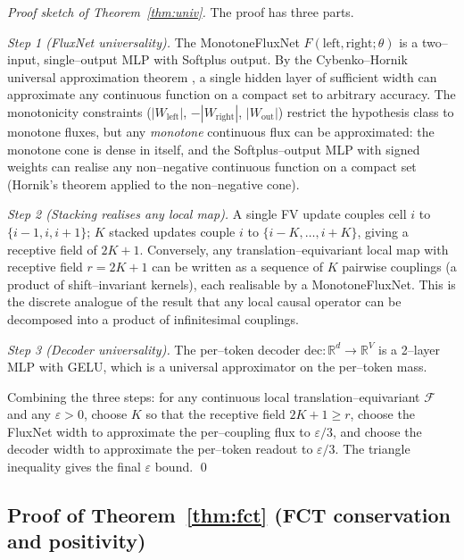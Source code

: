 \documentclass[10pt]{article}
\theoremstyle{definition}
\theoremstyle{remark}
\newcommand{\R}{\mathbb{R}}
\begin{document}
\begin{proof}[Proof sketch of Theorem~\ref{thm:univ}]
  The proof has three parts.

  \emph{Step 1 (FluxNet universality).}  The MonotoneFluxNet
  $F(\text{left}, \text{right}; \theta)$ is a two--input, single--output
  MLP with Softplus output.  By the Cybenko--Hornik universal
  approximation theorem \cite{hornik1991approximation}, a single
  hidden layer of sufficient width can approximate any continuous
  function on a compact set to arbitrary accuracy.  The monotonicity
  constraints ($|W_\text{left}|$, $-|W_\text{right}|$, $|W_\text{out}|$)
  restrict the hypothesis class to monotone fluxes, but any
  \emph{monotone} continuous flux can be approximated: the monotone
  cone is dense in itself, and the Softplus--output MLP with signed
  weights can realise any non--negative continuous function on a
  compact set (Hornik's theorem applied to the non--negative cone).

  \emph{Step 2 (Stacking realises any local map).}  A single FV
  update couples cell $i$ to $\{i-1, i, i+1\}$; $K$ stacked updates
  couple $i$ to $\{i-K, \dots, i+K\}$, giving a receptive field of
  $2K+1$.  Conversely, any translation--equivariant local map with
  receptive field $r = 2K+1$ can be written as a sequence of $K$
  pairwise couplings (a product of shift--invariant kernels), each
  realisable by a MonotoneFluxNet.  This is the discrete analogue of
  the result that any local causal operator can be decomposed into a
  product of infinitesimal couplings.

  \emph{Step 3 (Decoder universality).}  The per--token decoder
  $\mathrm{dec}: \R^d \to \R^V$ is a 2--layer MLP with GELU, which is
  a universal approximator \cite{hornik1991approximation} on the
  per--token mass.

  Combining the three steps: for any continuous local
  translation--equivariant $\mathcal{F}$ and any $\varepsilon > 0$,
  choose $K$ so that the receptive field $2K+1 \ge r$, choose the
  FluxNet width to approximate the per--coupling flux to
  $\varepsilon/3$, and choose the decoder width to approximate the
  per--token readout to $\varepsilon/3$.  The triangle inequality
  gives the final $\varepsilon$ bound.
  \qed
\end{proof}

\subsection{Proof of Theorem~\ref{thm:fct} (FCT conservation and positivity)}
\label{app:fct-proof}
\end{document}
